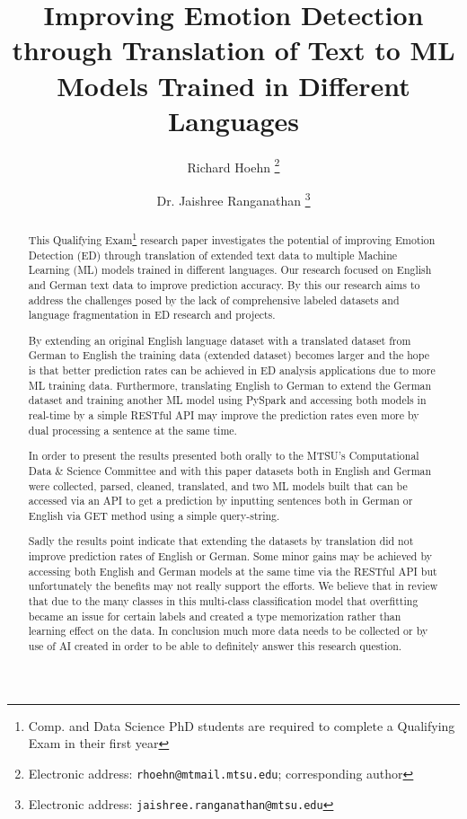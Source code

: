 \documentclass[11pt]{article}
\title{Improving Emotion Detection through Translation of Text to ML Models Trained in Different Languages}
\author{Richard Hoehn%
	\thanks{Electronic address: \texttt{rhoehn@mtmail.mtsu.edu}; corresponding author}}
\affil{Middle Tennessee State University}
\author{Dr. Jaishree Ranganathan%
	\thanks{Electronic address: \texttt{jaishree.ranganathan@mtsu.edu}}}
\affil{Middle Tennessee State University}
\begin{document}
\maketitle

\begin{abstract}
This Qualifying Exam\footnote{Comp. and Data Science PhD students are required to complete a Qualifying Exam in their first year} research paper investigates the potential of improving Emotion Detection (ED) through translation of extended text data to multiple Machine Learning (ML) models trained in different languages. Our research focused on  English and German text data to improve prediction accuracy. By this our research aims to address the challenges posed by the lack of comprehensive labeled datasets and language fragmentation in ED research and projects.

By extending an original English language dataset with a translated dataset from German to English the training data (extended dataset) becomes larger and the hope is that better prediction rates can be achieved in ED analysis applications due to more ML training data. Furthermore, translating English to German to extend the German dataset and training another ML model using PySpark and accessing both models in real-time by a simple RESTful API may improve the prediction rates even more by dual processing a sentence at the same time.

In order to present the results presented both orally to the MTSU's Computational Data \& Science Committee and with this paper datasets both in English and German were collected, parsed, cleaned, translated, and two ML models built that can be accessed via an API to get a prediction by inputting sentences both in German or English via GET method using a simple query-string.

Sadly the results point indicate that extending the datasets by translation did not improve prediction rates of English or German. Some minor gains may be achieved by accessing both English and German models at the same time via the RESTful API but unfortunately the benefits may not really support the efforts. We believe that in review that due to the many classes in this multi-class classification model that overfitting became an issue for certain labels and created a type memorization rather than learning effect on the data. In conclusion much more data needs to be collected or by use of AI created in order to be able to definitely answer this research question.
\end{abstract}
\clearpage
\end{document}
